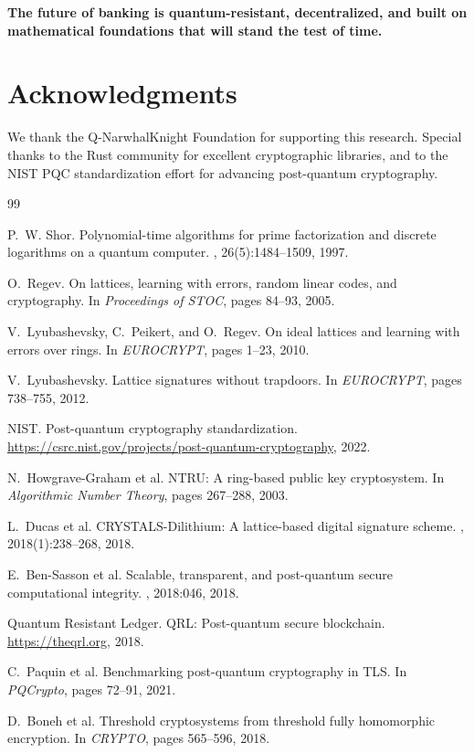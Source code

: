 \documentclass[11pt,a4paper]{article}
\begin{document}
\textbf{The future of banking is quantum-resistant, decentralized, and built on mathematical foundations that will stand the test of time.}

\section*{Acknowledgments}

We thank the Q-NarwhalKnight Foundation for supporting this research. Special thanks to the Rust community for excellent cryptographic libraries, and to the NIST PQC standardization effort for advancing post-quantum cryptography.


\begin{thebibliography}{99}

P.~W. Shor.
\newblock Polynomial-time algorithms for prime factorization and discrete logarithms on a quantum computer.
, 26(5):1484--1509, 1997.

O.~Regev.
\newblock On lattices, learning with errors, random linear codes, and cryptography.
\newblock In {\em Proceedings of STOC}, pages 84--93, 2005.

V.~Lyubashevsky, C.~Peikert, and O.~Regev.
\newblock On ideal lattices and learning with errors over rings.
\newblock In {\em EUROCRYPT}, pages 1--23, 2010.

V.~Lyubashevsky.
\newblock Lattice signatures without trapdoors.
\newblock In {\em EUROCRYPT}, pages 738--755, 2012.

NIST.
\newblock Post-quantum cryptography standardization.
\newblock \url{https://csrc.nist.gov/projects/post-quantum-cryptography}, 2022.

N.~Howgrave-Graham et al.
\newblock NTRU: A ring-based public key cryptosystem.
\newblock In {\em Algorithmic Number Theory}, pages 267--288, 2003.

L.~Ducas et al.
\newblock CRYSTALS-Dilithium: A lattice-based digital signature scheme.
, 2018(1):238--268, 2018.

E.~Ben-Sasson et al.
\newblock Scalable, transparent, and post-quantum secure computational integrity.
, 2018:046, 2018.

Quantum Resistant Ledger.
\newblock QRL: Post-quantum secure blockchain.
\newblock \url{https://theqrl.org}, 2018.

C.~Paquin et al.
\newblock Benchmarking post-quantum cryptography in TLS.
\newblock In {\em PQCrypto}, pages 72--91, 2021.

D.~Boneh et al.
\newblock Threshold cryptosystems from threshold fully homomorphic encryption.
\newblock In {\em CRYPTO}, pages 565--596, 2018.

\end{thebibliography}
\end{document}
